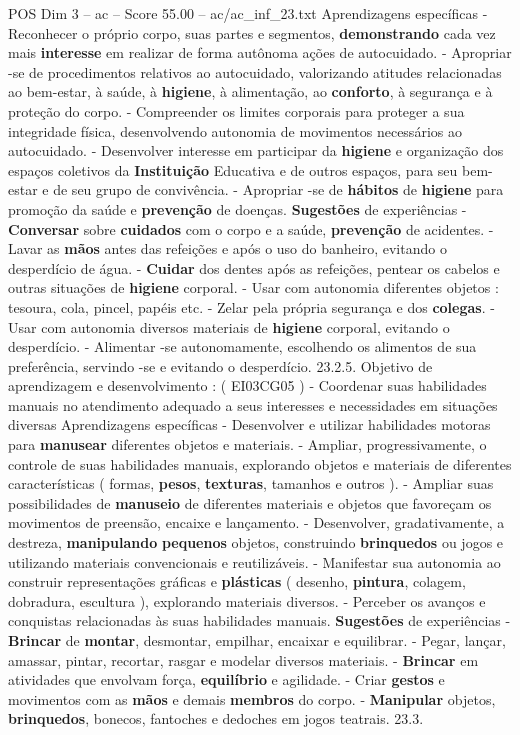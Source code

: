 \begin{textsample}{POS Dim 3 – ac – Score 55.00 – ac/ac\_inf\_23.txt}
Aprendizagens específicas - Reconhecer o próprio corpo, suas partes e segmentos, \textbf{demonstrando} cada vez mais \textbf{interesse} em realizar de forma autônoma ações de autocuidado. - Apropriar -se de procedimentos relativos ao autocuidado, valorizando atitudes relacionadas ao bem-estar, à saúde, à \textbf{higiene}, à alimentação, ao \textbf{conforto}, à segurança e à proteção do corpo. - Compreender os limites corporais para proteger a sua integridade física, desenvolvendo autonomia de movimentos necessários ao autocuidado. - Desenvolver interesse em participar da \textbf{higiene} e organização dos espaços coletivos da \textbf{Instituição} Educativa e de outros espaços, para seu bem-estar e de seu grupo de convivência. - Apropriar -se de \textbf{hábitos} de \textbf{higiene} para promoção da saúde e \textbf{prevenção} de doenças. \textbf{Sugestões} de experiências - \textbf{Conversar} sobre \textbf{cuidados} com o corpo e a saúde, \textbf{prevenção} de acidentes. - Lavar as \textbf{mãos} antes das refeições e após o uso do banheiro, evitando o desperdício de água. - \textbf{Cuidar} dos dentes após as refeições, pentear os cabelos e outras situações de \textbf{higiene} corporal. - Usar com autonomia diferentes objetos : tesoura, cola, pincel, papéis etc. - Zelar pela própria segurança e dos \textbf{colegas}. - Usar com autonomia diversos materiais de \textbf{higiene} corporal, evitando o desperdício. - Alimentar -se autonomamente, escolhendo os alimentos de sua preferência, servindo -se e evitando o desperdício. 23.2.5.
Objetivo de aprendizagem e desenvolvimento : ( EI03CG05 ) - Coordenar suas habilidades manuais no atendimento adequado a seus interesses e necessidades em situações diversas Aprendizagens específicas - Desenvolver e utilizar habilidades motoras para \textbf{manusear} diferentes objetos e materiais. - Ampliar, progressivamente, o controle de suas habilidades manuais, explorando objetos e materiais de diferentes características ( formas, \textbf{pesos}, \textbf{texturas}, tamanhos e outros ). - Ampliar suas possibilidades de \textbf{manuseio} de diferentes materiais e objetos que favoreçam os movimentos de preensão, encaixe e lançamento. - Desenvolver, gradativamente, a destreza, \textbf{manipulando} \textbf{pequenos} objetos, construindo \textbf{brinquedos} ou jogos e utilizando materiais convencionais e reutilizáveis. - Manifestar sua autonomia ao construir representações gráficas e \textbf{plásticas} ( desenho, \textbf{pintura}, colagem, dobradura, escultura ), explorando materiais diversos. - Perceber os avanços e conquistas relacionadas às suas habilidades manuais. \textbf{Sugestões} de experiências - \textbf{Brincar} de \textbf{montar}, desmontar, empilhar, encaixar e equilibrar. - Pegar, lançar, amassar, pintar, recortar, rasgar e modelar diversos materiais. - \textbf{Brincar} em atividades que envolvam força, \textbf{equilíbrio} e agilidade. - Criar \textbf{gestos} e movimentos com as \textbf{mãos} e demais \textbf{membros} do corpo. - \textbf{Manipular} objetos, \textbf{brinquedos}, bonecos, fantoches e dedoches em jogos teatrais. 23.3.

\end{textsample}
